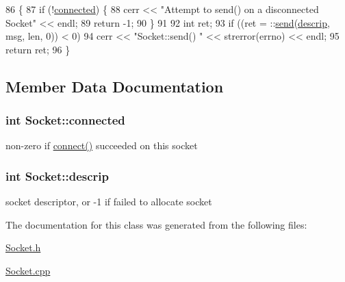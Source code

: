 \begin{DoxyCode}
86                                          \{
87   \textcolor{keywordflow}{if} (!\hyperlink{classSocket_af04394b9f1235562146aaa9291df70f8}{connected}) \{
88     cerr << \textcolor{stringliteral}{"Attempt to send() on a disconnected Socket"} << endl;
89     \textcolor{keywordflow}{return} -1;
90   \}
91 
92   \textcolor{keywordtype}{int} ret;
93   \textcolor{keywordflow}{if} ((ret = ::\hyperlink{classSocket_aca3e5b9c5459a50bd8fb03d29ef9e48e}{send}(\hyperlink{classSocket_a457f5e3f2429eb859f9e80f064073874}{descrip}, msg, len, 0)) < 0)
94     cerr << \textcolor{stringliteral}{"Socket::send() "} << strerror(errno) << endl;
95   \textcolor{keywordflow}{return} ret;
96 \}
\end{DoxyCode}


\subsection{Member Data Documentation}
\hypertarget{classSocket_af04394b9f1235562146aaa9291df70f8}{}
\subsubsection[{connected}]{\setlength{\rightskip}{0pt plus 5cm}int Socket\+::connected\hspace{0.3cm}{\ttfamily [protected]}}\label{classSocket_af04394b9f1235562146aaa9291df70f8}
non-\/zero if \hyperlink{classSocket_abc97e53080c01a06cc8f5efea7c6cdf0}{connect()} succeeded on this socket \hypertarget{classSocket_a457f5e3f2429eb859f9e80f064073874}{}
\subsubsection[{descrip}]{\setlength{\rightskip}{0pt plus 5cm}int Socket\+::descrip\hspace{0.3cm}{\ttfamily [protected]}}\label{classSocket_a457f5e3f2429eb859f9e80f064073874}
socket descriptor, or -\/1 if failed to allocate socket 

The documentation for this class was generated from the following files\+:\begin{DoxyCompactItemize}
\item 
\hyperlink{Socket_8h}{Socket.\+h}\item 
\hyperlink{Socket_8cpp}{Socket.\+cpp}\end{DoxyCompactItemize}
